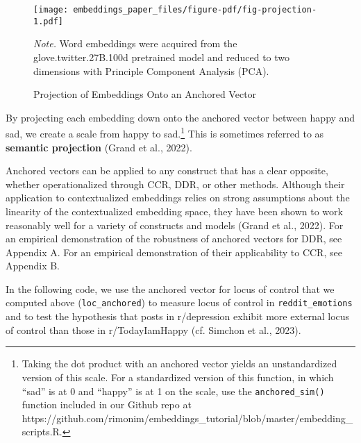 \documentclass[
  man,
  floatsintext,
  longtable,
  nolmodern,
  notxfonts,
  notimes,
  colorlinks=true,linkcolor=blue,citecolor=blue,urlcolor=blue]{apa7}
\begin{document}
\begin{figure}[!htbp]

{\caption{{Projection of Embeddings Onto an Anchored
Vector}{\label{fig-projection}}}}

\texttt{[image: embeddings\_paper\_files/figure-pdf/fig-projection-1.pdf]}

{\noindent \emph{Note.} Word embeddings were acquired from the
glove.twitter.27B.100d pretrained model and reduced to two dimensions
with Principle Component Analysis (PCA).}

\end{figure}

By projecting each embedding down onto the anchored vector between happy
and sad, we create a scale from happy to sad.\footnote{Taking the dot
  product with an anchored vector yields an unstandardized version of
  this scale. For a standardized version of this function, in which
  ``sad'' is at 0 and ``happy'' is at 1 on the scale, use the
  \texttt{anchored\_sim()} function included in our Github repo at
  https://github.com/rimonim/embeddings\_tutorial/blob/master/embedding\_scripts.R.}
This is sometimes referred to as \textbf{semantic projection} (Grand et
al., 2022).

Anchored vectors can be applied to any construct that has a clear
opposite, whether operationalized through CCR, DDR, or other methods.
Although their application to contextualized embeddings relies on strong
assumptions about the linearity of the contextualized embedding space,
they have been shown to work reasonably well for a variety of constructs
and models (Grand et al., 2022). For an empirical demonstration of the
robustness of anchored vectors for DDR, see Appendix A. For an empirical
demonstration of their applicability to CCR, see Appendix B.

In the following code, we use the anchored vector for locus of control
that we computed above (\texttt{loc\_anchored}) to measure locus of
control in \texttt{reddit\_emotions} and to test the hypothesis that
posts in r/depression exhibit more external locus of control than those
in r/TodayIamHappy (cf. Simchon et al., 2023).
\end{document}
